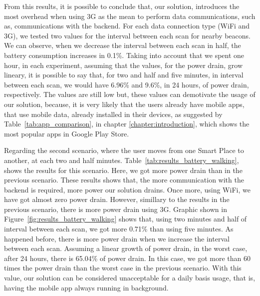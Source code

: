 From this results, it is possible to conclude that, our solution, introduces the most overhead when using \gls{3G} as the mean to perform data communications, such as, communications with the backend.
For each data connection type (\gls{WiFi} and \gls{3G}), we tested two values for the interval between each scan for nearby beacons.
We can observe, when we decrease the interval between each scan in half, the battery consumption increases in 0.1\%.
Taking into account that we spent one hour, in each experiment, assuming that the values, for the power drain, grow lineary, it is possible to say that, for two and half and five minutes, in interval between each scan, we would have 6.96\% and 9.6\%, in 24 hours, of power drain, respectively.
The values are still low but, these values can demotivate the usage of our solution, because, it is very likely that the users already have mobile apps, that use mobile data, already installed in their devices, as suggested by Table~\ref{tab:app_comparison}, in chapter \ref{chapter:introduction}, which shows the most popular apps in Google Play Store.

Regarding the second scenario, where the user moves from one Smart Place to another, at each two and half minutes.
Table~\ref{tab:results_battery_walking}, shows the results for this scenario. Here, we got more power drain than in the previous scenario.
These results shows that, the more communication with the backend is required, more power our solution drains.
Once more, using \gls{WiFi}, we have got almost zero power drain.
However, simillary to the results in the previous scenario, there is more power drain using \gls{3G}.
Graphic shown in Figure~\ref{fig:results_battery_walking} shows that, using two minutes and half of interval between each scan, we got more 0.71\% than using five minutes.
As happened before, there is more power drain when we increase the interval between each scan.
Assuming a linear growth of power drain, in the worst case, after 24 hours, there is 65.04\% of power drain.
In this case, we got more than 60 times the power drain than the worst case in the previous scenario.
With this value, our solution can be considered unacceptable for a daily basis usage, that is, having the mobile app always running in background.



